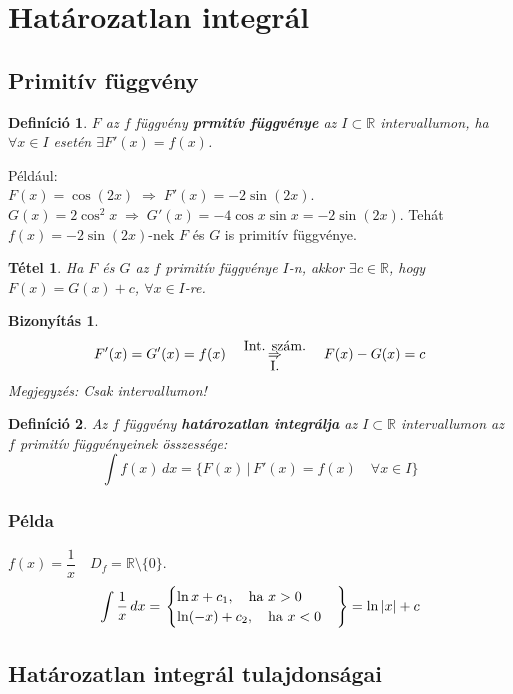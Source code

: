 \documentclass[a4paper,12pt,twoside]{book}
\newtheorem{tetel}{Tétel}[chapter]
\newtheorem{defi}{Definíció}[chapter]
\theoremstyle{break}
\theoremstyle{plain}
\newtheorem{bizNoNL}[biz]{Bizonyítás}
\newcommand{\integ}[1]{\ensuremath{\int #1\, dx}}
\begin{document}
\section{Határozatlan integrál}

\subsection{Primitív függvény}

\begin{defi}
 $F$ az $f$ függvény \textbf{prmitív függvénye} az $I\subset \mathbb{R}$ intervallumon, ha $\forall x\in I$ esetén $\exists F'(x) = f(x)$.
\end{defi}
Például:\\
$F(x) = \cos(2x) \; \Rightarrow \; F'(x)=-2\sin(2x)$.\\
$G(x)=2\cos^2 x \;\Rightarrow\; G'(x) = -4\cos x\sin x = -2\sin (2x)$. Tehát $f(x)=-2\sin (2x)$-nek $F$ és $G$ is primitív függvénye.

\begin{tetel}
 Ha $F$ és $G$ az $f$ primitív függvénye $I$-n, akkor $\exists c\in\mathbb{R}$, hogy $F(x)=G(x)+c$, $\forall x\in I$-re.
\end{tetel}
\begin{bizNoNL}
 \[F'(x)=G'(x)=f(x) \quad \underset{\hbox{I.}}{\overset{\hbox{Int. szám.}}{\Rightarrow}} \quad F(x)-G(x) = c\]
Megjegyzés: Csak intervallumon!
\end{bizNoNL}

\begin{defi}
 Az $f$ függvény \textbf{határozatlan integrálja} az $I\subset \mathbb{R}$ intervallumon az $f$ primitív függvényeinek összessége:
\[\integ{f(x)} = \Big\{F(x) \,\big|\, F'(x) = f(x) \quad \forall x\in I\Big\}\]
\end{defi}

\subsubsection{Példa}

$f(x) = \dfrac{1}{x} \quad D_f = \mathbb{R}\setminus\{0\}$.
\[\integ{\dfrac{1}{x}} = \left.\begin{cases}
  \ln x + c_1, \quad \hbox{ha } x>0\\
  \ln(-x) + c_2, \quad \hbox{ha } x<0\\
\end{cases}\right\} = \ln|x| + c
\]

\subsection{Határozatlan integrál tulajdonságai}
\end{document}
